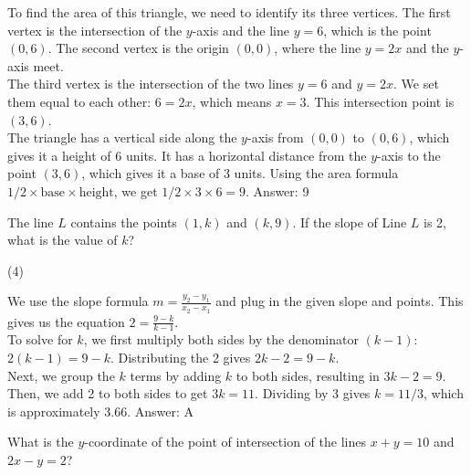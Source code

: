 \documentclass[11pt,paper=a4,answers]{exam}
\begin{document}
\begin{questions}
\begin{solution}
To find the area of this triangle, we need to identify its three vertices. The first vertex is the intersection of the $y$-axis and the line $y = 6$, which is the point $(0, 6)$. The second vertex is the origin $(0, 0)$, where the line $y = 2x$ and the $y$-axis meet.
\\[10pt]
The third vertex is the intersection of the two lines $y = 6$ and $y = 2x$. We set them equal to each other: $6 = 2x$, which means $x = 3$. This intersection point is $(3, 6)$.
\\[10pt]
The triangle has a vertical side along the $y$-axis from $(0, 0)$ to $(0, 6)$, which gives it a height of 6 units. It has a horizontal distance from the $y$-axis to the point $(3, 6)$, which gives it a base of 3 units. Using the area formula $1/2 \times \text{base} \times \text{height}$, we get $1/2 \times 3 \times 6 = 9$.
\vspace{15pt}
Answer: \colorbox{yellow!100}{9}
\end{solution}

\question
The line $L$ contains the points $(1, k)$ and $(k, 9)$. If the slope of Line $L$ is 2, what is the value of $k$?
\begin{tasks}(4)
\end{tasks}

\begin{solution}
We use the slope formula $m = \frac{y_2 - y_1}{x_2 - x_1}$ and plug in the given slope and points. This gives us the equation $2 = \frac{9 - k}{k - 1}$.
\\[10pt]
To solve for $k$, we first multiply both sides by the denominator $(k - 1)$: $2(k - 1) = 9 - k$. Distributing the 2 gives $2k - 2 = 9 - k$.
\\[10pt]
Next, we group the $k$ terms by adding $k$ to both sides, resulting in $3k - 2 = 9$. Then, we add 2 to both sides to get $3k = 11$. Dividing by 3 gives $k = 11/3$, which is approximately 3.66.
\vspace{15pt}
Answer: \colorbox{yellow!100}{A}
\end{solution}

\question
What is the $y$-coordinate of the point of intersection of the lines $x + y = 10$ and $2x - y = 2$?


\end{questions}
\end{document}
